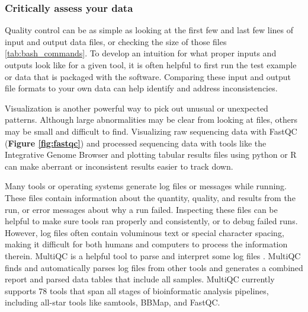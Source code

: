 \documentclass[10pt,letterpaper]{article}
\begin{document}
\subsubsection*{Critically assess your data}
Quality control can be as simple as looking at the first few and last few lines of input and output data files, or checking the size of those files {\ref{tab:bash_commands}}. 
To develop an intuition for what proper inputs and outputs look like for a given tool, it is often helpful to first run the test example or data that is packaged with the software. 
Comparing these input and output file formats to your own data can help identify and address inconsistencies. 

Visualization is another powerful way to pick out unusual or unexpected patterns. 
Although large abnormalities may be clear from looking at files, others may be small and difficult to find. 
Visualizing raw sequencing data with FastQC (\textbf{Figure \ref{fig:fastqc}}) and processed sequencing data with tools like the Integrative Genome Browser and plotting tabular results files using python or R can make aberrant or inconsistent results easier to track down.

Many tools or operating systems generate log files or messages while running. 
These files contain information about the quantity, quality, and results from the run, or error messages about why a run failed. 
Inspecting these files can be helpful to make sure tools ran properly and consistently, or to debug failed runs. 
However, log files often contain voluminous text or special character spacing, making it difficult for both humans and computers to process the information therein. 
MultiQC is a helpful tool to parse and interpret some log files \cite{ewels2016}. 
MultiQC finds and automatically parses log files from other tools and generates a combined report and parsed data tables that include all samples. 
MultiQC currently supports 78 tools that span all stages of bioinformatic analysis pipelines, including all-star tools like samtools, BBMap, and FastQC. 
\end{document}

